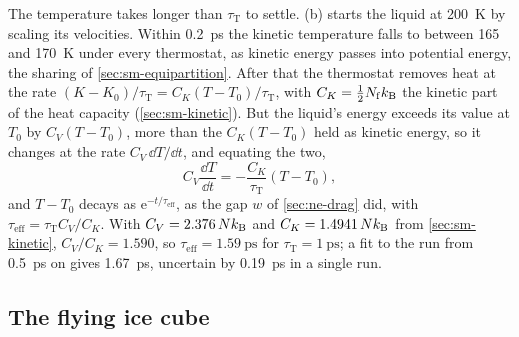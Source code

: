 The temperature takes longer than $\tau_{\mathrm T}$ to settle.
(b) starts the liquid at \SI{200}{\kelvin} by
scaling its velocities. Within \SI{0.2}{\pico\second} the kinetic
temperature falls to between 165 and \SI{170}{\kelvin} under every
thermostat, as kinetic energy passes into potential energy, the sharing
of \cref{sec:sm-equipartition}. After that the thermostat removes heat at
the rate $(K - K_0)/\tau_{\mathrm T} = C_K(T - T_0)/\tau_{\mathrm T}$,
with $C_K = \frac12N_{\mathrm f}k_{\mathrm{B}}$ the kinetic part of the heat
capacity (\cref{sec:sm-kinetic}). But the liquid's energy exceeds its
value at $T_0$ by $C_V(T - T_0)$, more than the $C_K(T - T_0)$ held as
kinetic energy, so it
changes at the rate $C_V\,\dd T/\dd t$, and equating the two,
\begin{equation*}
   C_V\frac{\dd T}{\dd t} = -\frac{C_K}{\tau_{\mathrm T}}(T - T_0) ,
\end{equation*}
and $T - T_0$ decays as $\mathrm{e}^{-t/\tau_{\mathrm{eff}}}$, as the gap
$w$ of \cref{sec:ne-drag} did, with $\tau_{\mathrm{eff}} = \tau_{\mathrm
T}C_V/C_K$. With $C_V = 2.376\,Nk_{\mathrm{B}}$ and $C_K = 1.4941\,Nk_{\mathrm{B}}$ from
\cref{sec:sm-kinetic}, $C_V/C_K = 1.590$, so $\tau_{\mathrm{eff}} =
\SI{1.59}{\pico\second}$ for $\tau_{\mathrm T} = \SI{1}{\pico\second}$; a
fit to the run from \SI{0.5}{\pico\second} on gives
\SI{1.67}{\pico\second}, uncertain by \SI{0.19}{\pico\second} in a single
run.

\subsection*{The flying ice cube}


